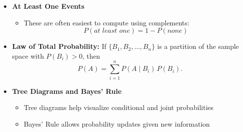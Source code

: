\documentclass{article}
\begin{document}
\begin{itemize}
  \item \textbf{At Least One Events}
  \begin{itemize}
    \item These are often easiest to compute using complements:
    \[
      P(\textit{at least one}) = 1 - P(\textit{none})
    \]
  \end{itemize}



  \item \textbf{Law of Total Probability:}
  If $\{B_1, B_2, \dots, B_n\}$ is a partition of the sample space with $P(B_i)>0$, then
    \[
    P(A) = \sum_{i=1}^n P(A \mid B_i)\,P(B_i).
    \]

  \item \textbf{Tree Diagrams and Bayes' Rule}
  \begin{itemize}
    \item Tree diagrams help visualize conditional and joint probabilities
    \item Bayes' Rule allows probability updates given new information
  \end{itemize}
\end{itemize}
\end{document}
